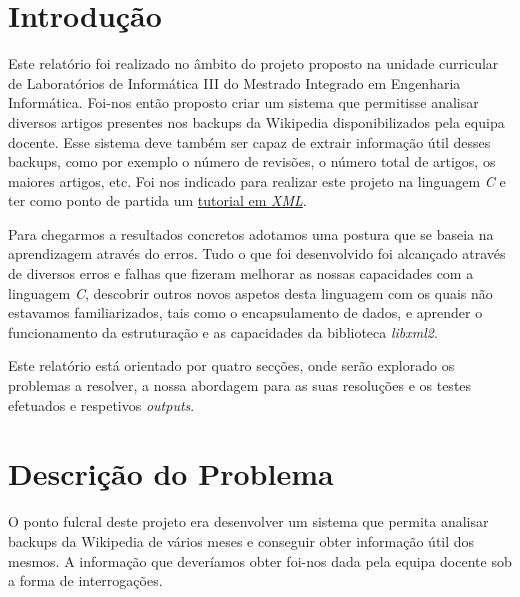 \documentclass[a4paper,12pt]{report}
\begin{document}
\renewcommand*{\lstlistlistingname}{Lista de Funções}




\maketitle
\tableofcontents


\chapter{Introdução}

Este relatório foi realizado no âmbito do projeto proposto na unidade curricular de Laboratórios de Informática III do Mestrado Integrado em Engenharia Informática. Foi-nos então proposto criar um sistema que permitisse analisar diversos artigos presentes nos backups da Wikipedia disponibilizados pela equipa docente. Esse sistema deve também ser capaz de extrair informação útil desses backups, como por exemplo o número de revisões, o número total de artigos, os maiores artigos, etc. 
Foi nos indicado para realizar este projeto na linguagem {\sl C} e ter como ponto de partida um \href{http://xmlsoft.org/tutorial/}{tutorial em {\sl XML}}.



Para chegarmos a resultados concretos adotamos uma postura que se baseia na aprendizagem através do erros. Tudo o que foi desenvolvido foi alcançado através de diversos erros e falhas que fizeram melhorar as nossas capacidades com a linguagem {\sl C}, descobrir outros novos aspetos desta linguagem com os quais não estavamos familiarizados, tais como o encapsulamento de dados, e aprender o funcionamento da estruturação e as capacidades da biblioteca {\sl libxml2}.

Este relatório está orientado por quatro secções, onde serão explorado os problemas a resolver, a nossa abordagem para as suas resoluções e os testes efetuados e respetivos {\sl outputs}.





\chapter{Descrição do Problema}

O ponto fulcral deste projeto era desenvolver um sistema que permita analisar backups da Wikipedia de vários meses e conseguir obter informação útil dos mesmos. A informação que deveríamos obter foi-nos dada pela equipa docente sob a forma de interrogações.
\end{document}
